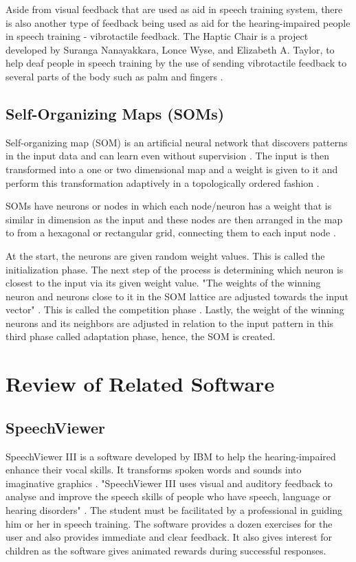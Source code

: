 Aside from visual feedback that are used as aid in speech training system, there is also another type of feedback being used as aid for the hearing-impaired people in speech training - vibrotactile feedback. The Haptic Chair is a project developed by Suranga Nanayakkara, Lonce Wyse, and Elizabeth A. Taylor, to help deaf people in speech training by the use of sending vibrotactile feedback to several parts of the body such as palm and fingers \cite{nanaya:2012:hap}.

\subsection{Self-Organizing Maps (SOMs)}

Self-organizing map (SOM) is an artificial neural network that discovers patterns in the input data and can learn even without supervision \cite{agustin:2014:SOM}. The input is then transformed into a one or two dimensional map and a weight is given to it and perform this transformation adaptively in a topologically ordered fashion \cite{chandar:2013:srs}.

SOMs have neurons or nodes in which each node/neuron has a weight that is similar in dimension as the input and these nodes are then arranged in the map to from a hexagonal or rectangular grid, connecting them to each input node \cite{agustin:2014:SOM}.

At the start, the neurons are given random weight values. This is called the initialization phase. The next step of the process is determining which neuron is closest to the input via its given weight value. "The weights of the winning neuron and neurons close to it in the SOM lattice are adjusted towards the input vector" \cite{chandar:2013:srs}. This is called the competition phase \cite{agustin:2014:SOM}. Lastly, the weight of the winning neurons and its neighbors are adjusted in relation to the input pattern in this third phase called adaptation phase, hence, the SOM is created.

\section{Review of Related Software}

\subsection{SpeechViewer}
SpeechViewer III is a software developed by IBM to help the hearing-impaired enhance their vocal skills. It transforms spoken words and sounds into imaginative graphics \cite{speechville:nd:slp}. "SpeechViewer III uses visual and auditory feedback to analyse and improve the speech skills of people who have speech, language or hearing disorders" \cite{kennedy:nd:spv}. The student must be facilitated by a professional in guiding him or her in speech training. The software provides a dozen exercises for the user and also provides immediate and clear feedback. It also gives interest for children as the software gives animated rewards during successful responses.

